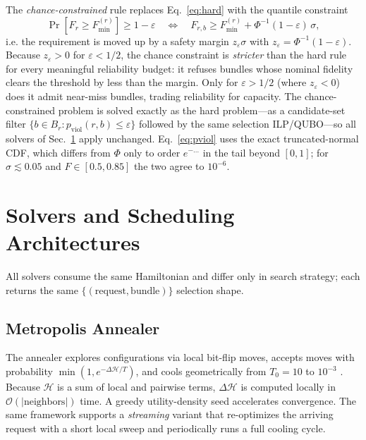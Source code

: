 \documentclass[twocolumn]{article}
\newcommand{\calH}{\mathcal{H}}
\begin{document}
The \emph{chance-constrained} rule replaces Eq.~\eqref{eq:hard} with
the quantile constraint
\begin{equation}
  \label{eq:chance}
  \Pr[F_r \ge F_{\min}^{(r)}] \ge 1-\varepsilon
  \quad\Longleftrightarrow\quad
  F_{r,b} \ge F_{\min}^{(r)} + \Phi^{-1}(1-\varepsilon)\, \sigma,
\end{equation}
i.e. the requirement is moved up by a safety margin $z_{\varepsilon}
\sigma$ with $z_{\varepsilon} = \Phi^{-1}(1-\varepsilon)$.  Because
$z_{\varepsilon} > 0$ for $\varepsilon < 1/2$, the chance constraint
is \emph{stricter} than the hard rule for every meaningful reliability
budget: it refuses bundles whose nominal fidelity clears the
threshold by less than the margin.  Only for $\varepsilon > 1/2$
(where $z_{\varepsilon} < 0$) does it admit near-miss bundles, trading
reliability for capacity.  The chance-constrained problem is solved
exactly as the hard problem---as a candidate-set filter
$\{b \in B_r : p_{\text{viol}}(r,b) \le \varepsilon\}$ followed by the
same selection ILP/QUBO---so all solvers of Sec.~\ref{sec:solvers}
apply unchanged.  Eq.~\eqref{eq:pviol} uses the exact truncated-normal
CDF, which differs from $\Phi$ only to order $e^{-\dots}$ in the tail
beyond $[0,1]$; for $\sigma \lesssim 0.05$ and $F \in [0.5,0.85]$ the
two agree to $10^{-6}$.

\section{Solvers and Scheduling Architectures}
\label{sec:solvers}

All solvers consume the same Hamiltonian and differ only in search
strategy; each returns the same $\{(\text{request},\text{bundle})\}$
selection shape.

\subsection{Metropolis Annealer}
\label{sec:metropolis}

The annealer explores configurations via local bit-flip moves, accepts
moves with probability $\min(1, e^{-\Delta \calH/T})$, and cools
geometrically from $T_0 = 10$ to $10^{-3}$
\cite{metropolis1953equation,rosales2025quantum}.  Because $\calH$ is a
sum of local and pairwise terms, $\Delta\calH$ is computed locally in
$\mathcal{O}(|\text{neighbors}|)$ time.  A greedy utility-density seed
accelerates convergence.  The same framework supports a
\emph{streaming} variant that re-optimizes the arriving request with a
short local sweep and periodically runs a full cooling cycle.
\end{document}
